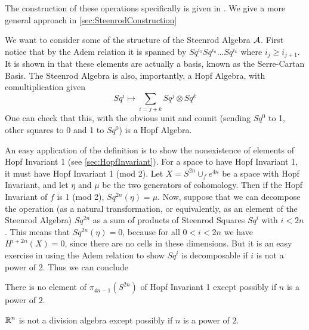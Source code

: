 The construction of these operations specifically is given in \cite[Ch~2]{MosherTengora}.  
We give a more general approach in \ref{sec:SteenrodConstruction}

We want to consider some of the structure of the Steenrod Algebra $\mathcal{A}$.  
First notice that by the Adem relation it is spanned by $Sq^{i_1}Sq^{i_n}...Sq^{i_k}$ where $i_j\ge i_{j+1}$.  
It is shown in \cite[Ch~6]{MosherTengora} that these elements are actually a basis, known as the Serre-Cartan Basis.  
The Steenrod Algebra is also, importantly, a Hopf Algebra, with comultiplication given
\[Sq^i\mapsto \sum_{i=j+k} Sq^j\otimes Sq^k\]
One can check that this, with the obvious unit and counit (sending $Sq^0$ to 1, other squares to 0 and 1 to $Sq^0$) is a Hopf Algebra.  

An easy application of the definition is to show the nonexistence of elements of Hopf Invariant 1 (see \ref{sec:HopfInvariant}).
For a space to have Hopf Invariant 1, it must have Hopf Invariant 1 (mod 2).  
Let $X=S^{2n}\cup_f e^{4n}$ be a space with Hopf Invariant, and let $\eta$ and $\mu$ be the two generators of cohomology.  
Then if the Hopf Invariant of $f$ is 1 (mod 2), $Sq^{2n}(\eta)=\mu$.
Now, suppose that we can decompose the operation (as a natural transformation, or equivalently, as an element of the Steenrod Algebra) $Sq^{2n}$ as a sum of products of Steenrod Squares $Sq^i$ with $i<2n$.  
This means that $Sq^{2n}(\eta)=0$, because for all $0<i<2n$ we have $H^{i+2n}(X)=0$, since there are no cells in these dimensions.  
But it is an easy exercise in using the Adem relation to show $Sq^i$ is decomposable if $i$ is not a power of 2.  
Thus we can conclude
\begin{Cor}
  There is no element of $\pi_{4n-1}(S^{2n})$ of Hopf Invariant 1 except possibly if $n$ is a power of $2$.  
\end{Cor}
\begin{Cor}
  $\mathbb{R}^n$ is not a division algebra except possibly if $n$ is a power of $2$.  
\end{Cor}


